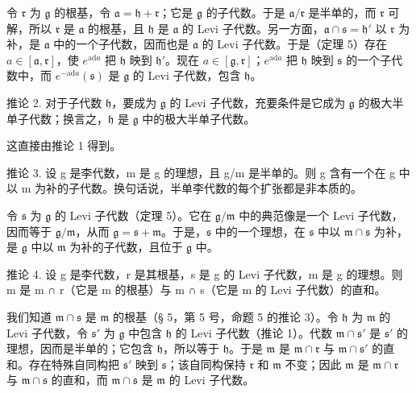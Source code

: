 令 \(\mathfrak{r}\) 为 \(\mathfrak{g}\) 的根基，令 \(\mathfrak{a} = \mathfrak{h} + \mathfrak{r}\)；它是 \(\mathfrak{g}\) 的子代数。于是 \(\mathfrak{a}/\mathfrak{r}\) 是半单的，而 \(\mathfrak{r}\) 可解，所以 \(\mathfrak{r}\) 是 \(\mathfrak{a}\) 的根基，且 \(\mathfrak{h}\) 是 \(\mathfrak{a}\) 的 Levi 子代数。另一方面，\(\mathfrak{a} \cap \mathfrak{s} = \mathfrak{h}'\) 以 \(\mathfrak{r}\) 为补，是 \(\mathfrak{a}\) 中的一个子代数，因而也是 \(\mathfrak{a}\) 的 Levi 子代数。于是（定理 5）存在 \(a \in [\mathfrak{a}, \mathfrak{r}]\)，使 \(e^{\mathrm{ad} a}\) 把 \(\mathfrak{h}\) 映到 \(\mathfrak{h}'\)。现在 \(a \in [\mathfrak{g}, \mathfrak{r}]\)；\(e^{\mathrm{ad} a}\) 把 \(\mathfrak{h}\) 映到 \(\mathfrak{s}\) 的一个子代数中，而 \(e^{-\mathrm{ad} a}(\mathfrak{s})\) 是 \(\mathfrak{g}\) 的 Levi 子代数，包含 \(\mathfrak{h}\)。

推论 2. 对于子代数 \(\mathfrak{h}\)，要成为 \(\mathfrak{g}\) 的 Levi 子代数，充要条件是它成为 \(\mathfrak{g}\) 的极大半单子代数；换言之，\(\mathfrak{h}\) 是 \(\mathfrak{g}\) 中的极大半单子代数。

这直接由推论 1 得到。

推论 3. 设 g 是李代数，m 是 g 的理想，且 g/m 是半单的。则 g 含有一个在 g 中以 m 为补的子代数。换句话说，半单李代数的每个扩张都是非本质的。

令 \(\mathfrak{s}\) 为 \(\mathfrak{g}\) 的 Levi 子代数（定理 5）。它在 \(\mathfrak{g}/\mathfrak{m}\) 中的典范像是一个 Levi 子代数，因而等于 \(\mathfrak{g}/\mathfrak{m}\)，从而 \(\mathfrak{g} = \mathfrak{s} + \mathfrak{m}\)。于是，\(\mathfrak{s}\) 中的一个理想，在 \(\mathfrak{s}\) 中以 \(\mathfrak{m} \cap \mathfrak{s}\) 为补，是 \(\mathfrak{g}\) 中以 \(\mathfrak{m}\) 为补的子代数，且位于 \(\mathfrak{g}\) 中。

推论 4. 设 g 是李代数，r 是其根基，s 是 g 的 Levi 子代数，m 是 g 的理想。则 m 是 m ∩ r（它是 m 的根基）与 m ∩ s（它是 m 的 Levi 子代数）的直和。

我们知道 \(\mathfrak{m} \cap \mathfrak{s}\) 是 \(\mathfrak{m}\) 的根基（§ 5，第 5 号，命题 5 的推论 3）。令 \(\mathfrak{h}\) 为 \(\mathfrak{m}\) 的 Levi 子代数，令 \(\mathfrak{s}'\) 为 \(\mathfrak{g}\) 中包含 \(\mathfrak{h}\) 的 Levi 子代数（推论 1）。代数 \(\mathfrak{m} \cap \mathfrak{s}'\) 是 \(\mathfrak{s}'\) 的理想，因而是半单的；它包含 \(\mathfrak{h}\)，所以等于 \(\mathfrak{h}\)。于是 \(\mathfrak{m}\) 是 \(\mathfrak{m} \cap \mathfrak{r}\) 与 \(\mathfrak{m} \cap \mathfrak{s}'\) 的直和。存在特殊自同构把 \(\mathfrak{s}'\) 映到 \(\mathfrak{s}\)；该自同构保持 \(\mathfrak{r}\) 和 \(\mathfrak{m}\) 不变；因此 \(\mathfrak{m}\) 是 \(\mathfrak{m} \cap \mathfrak{r}\) 与 \(\mathfrak{m} \cap \mathfrak{s}\) 的直和，而 \(\mathfrak{m} \cap \mathfrak{s}\) 是 \(\mathfrak{m}\) 的 Levi 子代数。

